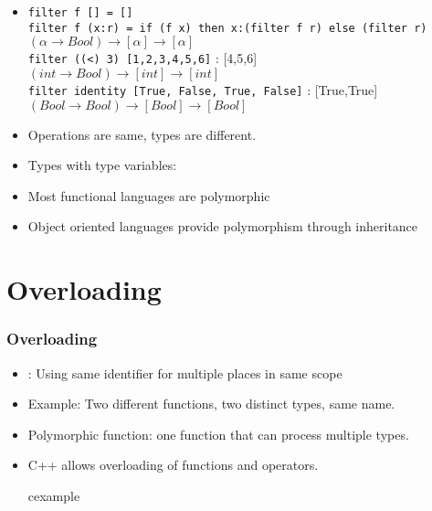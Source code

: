 \begin{frame}
 \begin{itemize}
  \item \texttt{\scriptsize filter f [] = []  \\
filter f (x:r) = if (f x) then x:(filter f r) else (filter r)}\\
 $(\alpha \rightarrow Bool) \rightarrow [\alpha] \rightarrow [\alpha]$\\
 \texttt{filter ((<) 3) [1,2,3,4,5,6]} : [4,5,6] \\
$(int \rightarrow Bool) \rightarrow [int] \rightarrow [int]$ \\
 \texttt{filter identity [True, False, True, False]} : [True,True] \\
 $(Bool \rightarrow Bool) \rightarrow [Bool] \rightarrow [Bool]$
\item Operations are same, types are different.
\item Types with type variables: 
\item Most functional languages are polymorphic
\item Object oriented languages provide polymorphism through inheritance
\end{itemize}
\end{frame}

\section{Overloading}
\begin{frame}
\frametitle{Overloading}
\begin{itemize}
 \item {}: Using same identifier for multiple places in same scope
 \item Example: Two different functions, two distinct types, same name.
 \item Polymorphic function: one function that can process multiple types.
 \item C++ allows overloading of functions and operators.
\begin{beamercolorbox}{cexample}
\codeoverCpp
\end{beamercolorbox}
\end{itemize}
\end{frame}

